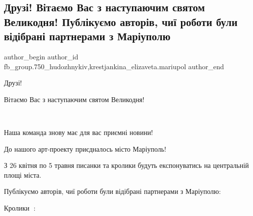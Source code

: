  
 
 
 
 

\subsection{Друзі! Вітаємо Вас з наступаючим святом Великодня! Публікуємо авторів, чиї роботи були відібрані партнерами з Маріуполю}
\label{sec:26_04_2019.fb.fb_group.750_hudozhnykiv.1.avtory_pysanky_zajci}
 
\ifcmt
 author_begin
   author_id fb_group.750_hudozhnykiv,krestjankina_elizaveta.mariupol
 author_end
\fi

Друзі!

Вітаємо Вас з наступаючим святом Великодня!

🎉🎉🎉

Наша команда знову має для вас приємні новини!

До нашого арт-проекту приєдналось місто Маріуполь!

З 26 квітня по 5 травня писанки та кролики будуть експонуватись на центральній
площі міста.

Публікуємо авторів, чиї роботи були відібрані партнерами з Маріуполю:

Кролики 🐰:

